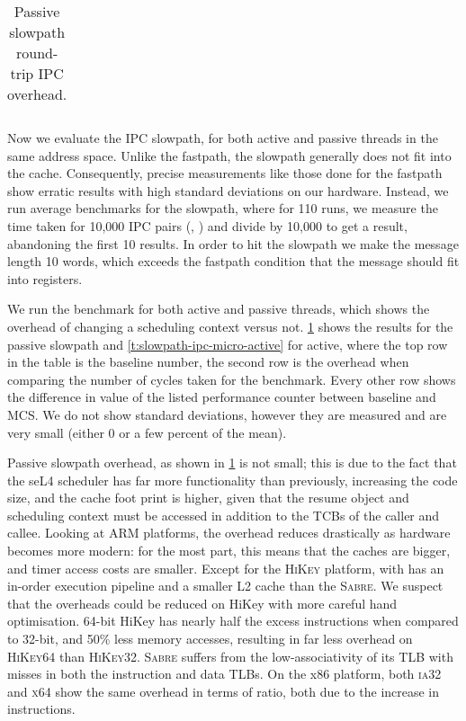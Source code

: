 \begin{table}[t]\centering
    \begin{tabularx}{\textwidth}{Xlllllll}\toprule
        
        \bottomrule
    \end{tabularx}
    \caption{Passive slowpath round-trip IPC overhead.}
    \label{t:slowpath-ipc-micro}
\end{table}
Now we evaluate the \gls{IPC} slowpath, for both active and passive threads in the same address
space.
Unlike the fastpath, the slowpath
generally does not fit into the cache. Consequently, precise measurements like those done for the
fastpath show erratic results with high standard deviations on our hardware. Instead, we run average
benchmarks for the slowpath, where for 110 runs, we measure the time taken for 10,000 IPC pairs
(\call, \replyrecv) and divide by 10,000 to get a result, abandoning the first 10 results. 
In order to hit the slowpath we make the message length 10 words, which exceeds
the fastpath condition that the message should fit into registers.

We run the benchmark for both active and passive threads, which shows the overhead of changing a
scheduling context versus not. \cref{t:slowpath-ipc-micro} shows the results for the passive
slowpath and \cref{t:slowpath-ipc-micro-active} for active, where the top row in the table is 
the baseline number, the second row is the overhead when
comparing the number of cycles taken for the benchmark. Every other row shows the difference in value of the 
listed performance counter between baseline and MCS. We do not show standard deviations, however
they are measured and are very small (either 0 or a few percent of the mean). 

Passive slowpath overhead, as shown in \cref{t:slowpath-ipc-micro} is not small;
this is due to the fact that the seL4 scheduler has far more
functionality than previously, increasing the code size, and the cache foot print is higher, given
that the resume object and scheduling context must be accessed in addition to the \glspl{TCB} of the
caller and callee. Looking at ARM platforms, the overhead reduces drastically as hardware becomes
more modern: for the most part, this means that the caches are bigger, and timer access costs are
smaller. Except for the \textsc{HiKey} platform, with has an in-order
execution pipeline and a smaller L2 cache than the \textsc{Sabre}. We suspect that the overheads could be reduced on HiKey with more careful hand
optimisation. 64-bit HiKey has nearly half the excess instructions when compared to 32-bit, and 
50\% less memory accesses, resulting in far less overhead on \textsc{HiKey64} than \textsc{HiKey32}.
\textsc{Sabre} suffers from the low-associativity of its \gls{TLB} with misses in both the instruction and
data TLBs. On the x86 platform, both \textsc{ia32} and \textsc{x64} show the same overhead in terms
of ratio, both due to the increase in instructions.

